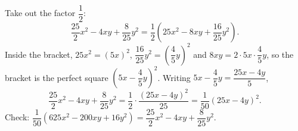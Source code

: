 Take out the factor $\dfrac{1}{2}$:
\[\dfrac{25}{2}x^2-4xy+\dfrac{8}{25}y^2=\dfrac{1}{2}\left(25x^2-8xy+\dfrac{16}{25}y^2\right).\]
Inside the bracket, $25x^2=(5x)^2$, $\dfrac{16}{25}y^2=\left(\dfrac{4}{5}y\right)^2$ and $8xy=2\cdot5x\cdot\dfrac{4}{5}y$, so the bracket is the perfect square $\left(5x-\dfrac{4}{5}y\right)^2$. Writing $5x-\dfrac{4}{5}y=\dfrac{25x-4y}{5}$,
\[\dfrac{25}{2}x^2-4xy+\dfrac{8}{25}y^2=\dfrac{1}{2}\cdot\dfrac{(25x-4y)^2}{25}=\boxed{\dfrac{1}{50}(25x-4y)^2}.\]
Check: $\dfrac{1}{50}\left(625x^2-200xy+16y^2\right)=\dfrac{25}{2}x^2-4xy+\dfrac{8}{25}y^2$.
